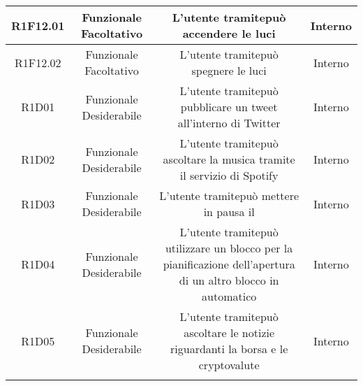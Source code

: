 \begin{tabularx}{\textwidth}{|C|C|C|C|}
	\hline
	R1F12.01&Funzionale Facoltativo  &L'utente tramitepuò accendere le luci &Interno \\
	\hline
	R1F12.02&Funzionale Facoltativo  &L'utente tramitepuò spegnere le luci &Interno \\
	\hline
	R1D01&Funzionale Desiderabile  &L'utente tramitepuò pubblicare un tweet all'interno di Twitter &Interno \\
	\hline
	R1D02&Funzionale Desiderabile  &L'utente tramitepuò ascoltare la musica tramite il servizio di Spotify &Interno \\
	\hline
	R1D03&Funzionale Desiderabile  &L'utente tramitepuò mettere in pausa il &Interno \\
	\hline
	R1D04&Funzionale Desiderabile  &L'utente tramitepuò utilizzare un blocco per la pianificazione dell'apertura di un altro blocco in automatico &Interno \\
	\hline
	R1D05&Funzionale Desiderabile  &L'utente tramitepuò ascoltare le notizie riguardanti la borsa e le cryptovalute &Interno \\
	\hline
	\caption{Tabella requisiti funzionali}
\end{tabularx}


